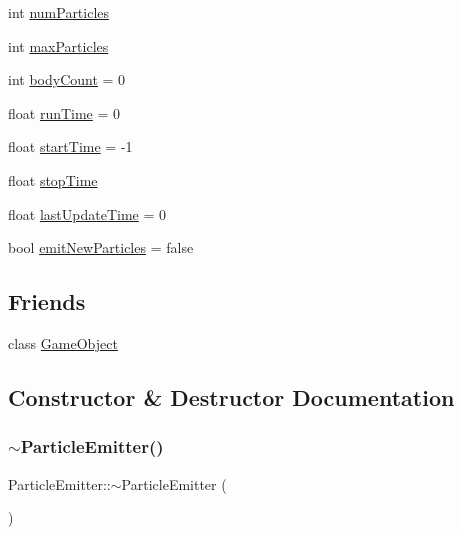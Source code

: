 \begin{DoxyCompactItemize}
\item 
int \hyperlink{class_mason_1_1_particle_emitter_a2df785f58db33ede9255ba835e955e11}{num\+Particles}
\item 
int \hyperlink{class_mason_1_1_particle_emitter_a591a7ed2fc6cded5dc19b144ece7b3fb}{max\+Particles}
\item 
int \hyperlink{class_mason_1_1_particle_emitter_a76a3eb861adfec2123479be32c66999c}{body\+Count} = 0
\item 
float \hyperlink{class_mason_1_1_particle_emitter_a5ae9088b02fdfd269dfd34c2a092e384}{run\+Time} = 0
\item 
float \hyperlink{class_mason_1_1_particle_emitter_a46d4d3d2871daba6f320dfbc1f89ace1}{start\+Time} = -\/1
\item 
float \hyperlink{class_mason_1_1_particle_emitter_a63333da2d5eb945d62e428f980c27523}{stop\+Time}
\item 
float \hyperlink{class_mason_1_1_particle_emitter_a79acae3c8f64f592e8868cb166b1a1ce}{last\+Update\+Time} = 0
\item 
bool \hyperlink{class_mason_1_1_particle_emitter_a615f89f70c414781aa518c8a035312bb}{emit\+New\+Particles} = false
\end{DoxyCompactItemize}
\subsection*{Friends}
\begin{DoxyCompactItemize}
\item 
class \hyperlink{class_mason_1_1_particle_emitter_a00df87c957d8f7ee0fc51f07a0542f4a}{Game\+Object}
\end{DoxyCompactItemize}


\subsection{Constructor \& Destructor Documentation}
\hypertarget{class_mason_1_1_particle_emitter_a6f4952f7555ede99d74d42b30c80f3e2}{}\label{class_mason_1_1_particle_emitter_a6f4952f7555ede99d74d42b30c80f3e2} 
\subsubsection{\texorpdfstring{$\sim$\+Particle\+Emitter()}{~ParticleEmitter()}}
{\footnotesize\ttfamily Particle\+Emitter\+::$\sim$\+Particle\+Emitter (\begin{DoxyParamCaption}{ }\end{DoxyParamCaption})}

